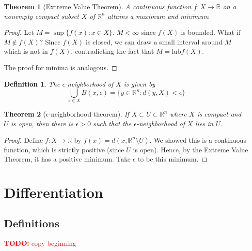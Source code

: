 \documentclass{article}
\newtheorem{theorem}{Theorem}
\newtheorem{definition}{Definition}
\newcommand{\reals}[0]{\mathbb{R}}
\newcommand{\TODO}[1]{\textcolor{red}{\textbf{TODO:} #1}}
\begin{document}
\begin{theorem}[Extreme Value Theorem]
  A continuous function \(f: X \to \reals\) on a nonempty compact subset \(X\) of \(\reals^n\) attains a maximum and minimum
\end{theorem}
\begin{proof}
  Let \(M = \sup\{f(x) : x \in X\}\). \(M < \infty\) since \(f(X)\) is bounded. What if \(M \notin f(X)\)? Since \(f(X)\) is closed, we can draw a small interval around \(M\) which is not in \(f(X)\), contradicting the fact that \(M = \mbox{lub} f(X)\).

  The proof for minima is analogous.
\end{proof}

\begin{definition}
  The \(\epsilon\)-neighborhood of \(X\) is given by
  \begin{equation}\bigcup_{x \in X}B(x, \epsilon) = \{y \in \reals^n : d(y, X) < \epsilon\}\end{equation}
\end{definition}

\begin{theorem}[\(\epsilon\)-neighborhood theorem]
  If \(X \subset U \subset \reals^n\) where \(X\) is compact and \(U\) is open, then there is \(\epsilon > 0\) such that the \(\epsilon\)-neighborhood of \(X\) lies in \(U\).
\end{theorem}
\begin{proof}
  Define \(f: X \to \reals\) by \(f(x) = d(x, \reals^n \setminus U)\). We showed this is a continuous function, which is strictly positive (since \(U\) is open). Hence, by the Extreme Value Theorem, it has a positive minimum. Take \(\epsilon\) to be this minimum.
\end{proof}

\section{Differentiation}

\subsection{Definitions}

\TODO{copy beginning}
\end{document}
